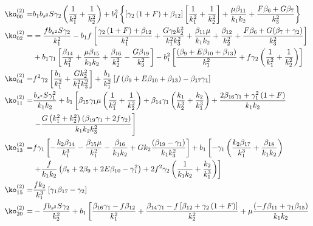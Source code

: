 {\begin{align*}
\ko_{00}^{(2)}=& b_1 b_{s^2} S \gamma_2 \left( \frac{1}{k_1^2} + \frac{1}{k_2^2} \right) + b_1^2 \left\{ \left[ \gamma_2 \left( 1 + F \right) + \beta_{12}\right] \left[\frac{1}{k_1^2} + \frac{1}{k_2^2} \right] + \frac{\mu \beta_{11}}{k_1 k_2} + \frac{F \beta_{6} + G \beta_{7} }{k_3^2}\right\}\\
%
\ko_{02}^{(2)}=& =\frac{f b_{s^2} S \gamma_2}{k_1^2} - b_1 f \left[  \frac{\gamma_2 \left( 1+F  \right) + \beta_{12}}{k_1^2} + \frac{G \gamma_2 k_2^2 }{k_1^2 k_3^2} + \frac{\beta_{11} \mu}{k_1 k_2} + \frac{\beta_{12}}{k_2^2} + \frac{F \beta_{6} + G (\beta_{7} + \gamma_2)}{k_3^2} \right]  \\
&+ b_1 \gamma_1 \left[ \frac{\beta_{14} }{k_1^2} + \frac{\mu \beta_{15} }{k_1 k_2} + \frac{\beta_{16}}{k_2^2} - \frac{G \beta_{19}}{k_3^2}\right] - b_1^2 \left[ \frac{\left(\beta_{9} + E \beta_{10} + \beta_{13}\right)}{k_1^2} + f \gamma_2 \left(\frac{1}{k_1^2} + \frac{1}{k_2^2} \right) \right] \\
\ko_{04}^{(2)}=& f^2 \gamma_2 \left[ \frac{b_1}{k_1^2} + \frac{G k_2^2}{k_1^2 k_3^2} \right] + \frac{b_1}{k_1^2} \left[ f \left( \beta_{9} + E \beta_{10} + \beta_{13} \right) - \beta_{17} \gamma_1 \right]\\
\ko_{11}^{(2)}=& \frac{b_{s^2} S \gamma_1^2}{k_1 k_2} + b_1 \left[ \beta_{15} \gamma_1 \mu \left(\frac{1}{k_1^2} + \frac{1}{k_2^2} \right) + \beta_{14} \gamma_1 \left( \frac{k_1}{k_2^3} + \frac{k_2}{k_1^3} \right) + \frac{2 \beta_{16} \gamma_1 + \gamma_1^2\left(1+F\right)}{k_1 k_2} \right.\\
&\left.- \frac{G \left(k_1^2 + k_2^2\right) \left(\beta_{19} \gamma_1  + 2 f \gamma_2\right)}{k_1 k_2 k_3^2} \right]\\
\ko_{13}^{(2)} =& f \gamma_1 \left[ - \frac{k_2 \beta_{14}}{k_1^3} - \frac{\beta_{15} \mu}{k_1^2} - \frac{\beta_{16}}{k_1 k_2} + G k_2 \frac{\left(\beta_{19} - \gamma_1\right)}{k_1 k_3^2}  \right] + b_1 \left[ -\gamma_1 \left( \frac{k_2 \beta_{17}}{k_1^3} + \frac{\beta_{18}}{k_1 k_2}\right) \right.  \\
&\left. + \frac{f}{k_1 k_2} \left(  \beta_{8} + 2 \beta_{9} + 2 E \beta_{10} - \gamma_1^2 \right) + 2 f^2 \gamma_2 \left( \frac{1}{k_1 k_2 }  + \frac{k_2}{k_1^3 }\right)\right] \\
\ko_{15}^{(2)}=& \frac{f k_2}{k_1^3} \left[ \gamma_1 \beta_{17} - \gamma_2 \right] \\
\ko_{20}^{(2)}=& - \frac{f b_{s^2} S \gamma_2}{k_2^2}  + b_1 \left[ \frac{\beta_{16} \gamma_1 - f \beta_{12}}{k_1^2} + \frac{\beta_{14} \gamma_1 - f \left[\beta_{12} + \gamma_2\left(1+F\right) \right]}{k_2^2} + \mu \frac{\left(- f \beta_{11} + \gamma_1 \beta_{15}\right)}{k_1 k_2}  \right. \\

\end{align*}}
